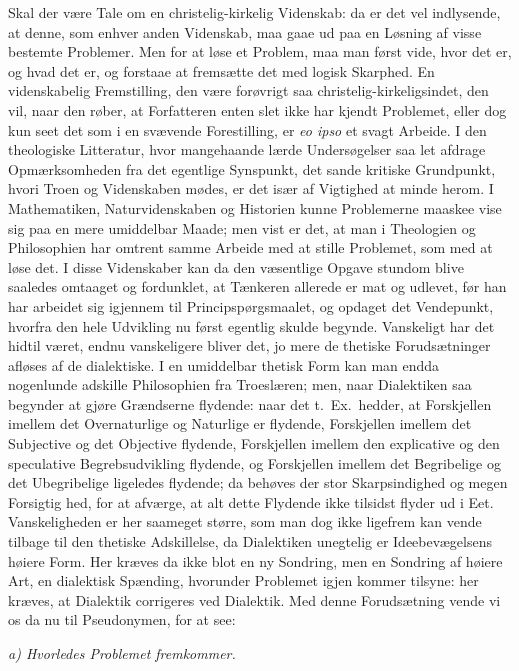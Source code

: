 Skal der være Tale om en christelig-kirkelig Videnskab: da er det
vel indlysende, at denne, som enhver anden Videnskab, maa gaae ud
paa en Løsning af visse bestemte Problemer. Men for at løse et
Problem, maa man først vide, hvor det er, og hvad det er, og
forstaae at fremsætte det med logisk Skarphed. En videnskabelig
Fremstilling, den være forøvrigt saa christelig-kirkeligsindet,
den vil, naar den røber, at Forfatteren
 enten slet ikke har kjendt Problemet, eller dog kun seet det som i
en svævende Forestilling, er \textit{eo ipso} et svagt Arbeide. I
den theologiske Litteratur, hvor mangehaande lærde Undersøgelser
saa let afdrage Opmærksomheden fra det egentlige Synspunkt, det
sande kritiske Grundpunkt, hvori Troen og Videnskaben mødes, er
det især af Vigtighed at minde herom. I Mathematiken,
Naturvidenskaben og Historien kunne Problemerne maaskee vise sig
paa en mere umiddelbar Maade; men vist er det, at man i Theologien
og Philosophien har omtrent samme Arbeide med at stille Problemet,
som med at løse det. I disse Videnskaber kan da den væsentlige
Opgave stundom blive saaledes omtaaget og fordunklet, at Tænkeren
allerede er mat og udlevet, før han har arbeidet sig igjennem til
Principspørgsmaalet, og opdaget det Vendepunkt, hvorfra den hele
Udvikling nu først egentlig skulde begynde. Vanskeligt har det
hidtil været, endnu vanskeligere bliver det, jo mere de thetiske
Forudsætninger afløses af de dialektiske. I en umiddelbar thetisk
Form kan man endda nogenlunde adskille Philosophien fra
Troeslæren; men, naar Dialektiken saa begynder at gjøre
Grændserne flydende: naar det t.\ Ex.\ hedder, at Forskjellen
imellem det Overnaturlige og Naturlige er flydende, Forskjellen
imellem det Subjective og det Objective flydende, Forskjellen
imellem den explicative og den speculative Begrebsudvikling
flydende, og Forskjellen imellem det Begribelige og det
Ubegribelige ligeledes flydende; da behøves der stor
Skarpsindighed og megen Forsigtig%
hed, for at afværge, at alt dette Flydende ikke tilsidst flyder ud
i Eet. Vanskeligheden er her saameget større, som man dog ikke
ligefrem kan vende tilbage til den thetiske Adskillelse, da
Dialektiken unegtelig er Ideebevægelsens høiere Form. Her kræves
da ikke blot en ny Sondring, men en Sondring af høiere Art, en
dialektisk Spænding, hvorunder Problemet igjen kommer tilsyne: her
kræves, at Dialektik corrigeres ved Dialektik. Med denne
Forudsætning vende vi os da nu til Pseudonymen, for at see:

\begin{center}
\emph{a) Hvorledes Problemet fremkommer.}
\end{center}


